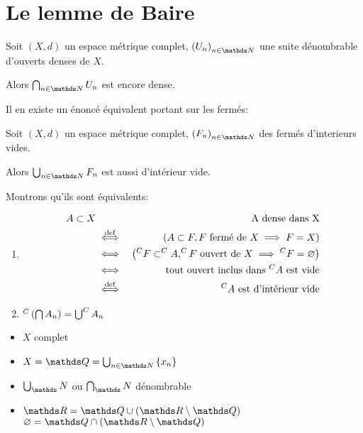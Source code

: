 
\chapter{Le lemme de Baire}
\begin{theorem}


Soit $(X,d)$ un espace métrique complet, $\parenthesis{U_n}_{n\in\NN}$ une suite dénombrable d'ouverts denses de $X$.

Alors $\bigcap_{n\in\NN} U_n$ est encore dense.
\end{theorem}

Il en existe un énoncé équivalent portant sur les fermés:

\begin{theorem}
  Soit $(X,d)$ un espace métrique complet, $\parenthesis{F_n}_{n\in\NN}$ des fermés d'interieurs vides.

  Alors $\bigcup_{n\in\NN} F_n$ est aussi d'intérieur vide.

\end{theorem}

Montrons qu'ils sont équivalents:

\begin{enumerate}
  \item \begin{eqnarray*}
          A\subset X && \text{A dense dans X}\\
                     &\overset{\mathrm{def}}{\iff}& \left(A\subset F, F \text{ fermé de } X \implies F = X\right)\\
                     &\iff& \left(^CF\subset ^CA, ^CF \text{ ouvert de } X \implies ^CF = \varnothing\right)\\
                     &\iff& \text{tout ouvert inclus dans $^CA$ est vide}\\
                     &\overset{\mathrm{def}}{\iff}& ^CA \text{ est d'intérieur vide}
        \end{eqnarray*}

  \item $^C\left(\bigcap A_n\right) = \bigcup ^C A_n$
\end{enumerate}

\begin{remarque}
  \begin{itemize}
    \item $X$ complet
    \item $X = \QQ = \bigcup_{n\in\NN} \rdbrackets{x_n}$
    \item $\bigcup_\NN$ ou $\bigcap_\NN$ dénombrable
    \item $\RR = \QQ\cup(\RR\setminus\QQ)$\\$\varnothing = \QQ\cap(\RR\setminus\QQ)$
  \end{itemize}
\end{remarque}

